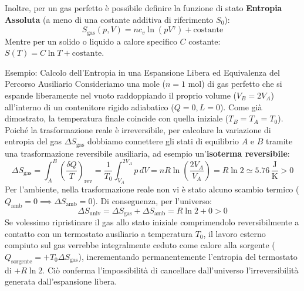 Inoltre, per un gas perfetto è possibile definire la funzione di stato \textbf{Entropia Assoluta} (a meno di una costante additiva di riferimento $S_0$):
\begin{equation}
    S_{\text{gas}}(p, V) = n c_v \ln\left(p V^\gamma\right) + \text{costante}
\end{equation}
Mentre per un solido o liquido a calore specifico $C$ costante: $S(T) = C \ln T + \text{costante}$.

\begin{osservazione}{Esempio: Calcolo dell'Entropia in una Espansione Libera ed Equivalenza del Percorso Ausiliario}
Consideriamo una mole ($n = 1\text{ mol}$) di gas perfetto che si espande liberamente nel vuoto raddoppiando il proprio volume ($V_B = 2V_A$) all'interno di un contenitore rigido adiabatico ($Q=0, L=0$). Come già dimostrato, la temperatura finale coincide con quella iniziale ($T_B = T_A = T_0$). Poiché la trasformazione reale è irreversibile, per calcolare la variazione di entropia del gas $\Delta S_{\text{gas}}$ dobbiamo connettere gli stati di equilibrio $A$ e $B$ tramite una trasformazione reversibile ausiliaria, ad esempio un'\textbf{isoterma reversibile}:
\begin{equation}
    \Delta S_{\text{gas}} = \int_A^B \left(\frac{\delta Q}{T}\right)_{\text{rev}} = \frac{1}{T_0} \int_{V_A}^{2V_A} p \, dV = n R \ln\left(\frac{2V_A}{V_A}\right) = R \ln 2 \simeq 5.76 \, \frac{\text{J}}{\text{K}} > 0
\end{equation}
Per l'ambiente, nella trasformazione reale non vi è stato alcuno scambio termico ($Q_{\text{amb}} = 0 \implies \Delta S_{\text{amb}} = 0$). Di conseguenza, per l'universo:
\begin{equation}
    \Delta S_{\text{univ}} = \Delta S_{\text{gas}} + \Delta S_{\text{amb}} = R \ln 2 + 0 > 0
\end{equation}
Se volessimo ripristinare il gas allo stato iniziale comprimendolo reversibilmente a contatto con un termostato ausiliario a temperatura $T_0$, il lavoro esterno compiuto sul gas verrebbe integralmente ceduto come calore alla sorgente ($Q_{\text{sorgente}} = +T_0 \Delta S_{\text{gas}}$), incrementando permanentemente l'entropia del termostato di $+R \ln 2$. Ciò conferma l'impossibilità di cancellare dall'universo l'irreversibilità generata dall'espansione libera.
\end{osservazione}

